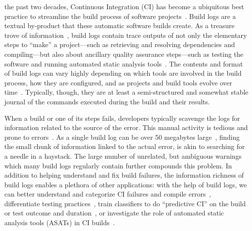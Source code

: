 
%


the past two decades, Continuous Integration (CI) has become a
ubiquitous best practice to streamline the build process of software
projects~\cite{hilton2016usage,beller2017oops,staahl2014modeling}.
Build logs are a textual by-product that these automatic software
builds create.
As a treasure trove of information~\cite{meyer},
build logs contain trace outputs of not only the elementary steps to
``make'' a project---such as retrieving and resolving dependencies and
compiling---but also about ancillary quality assurance steps---such as
testing the software and running automated static analysis
tools~\cite{beller2017oops}.
The
contents and format of build logs can vary highly depending on which tools
are involved in the build process, how they are
configured, and as projects and build tools evolve over
time~\cite{staahl2014modeling}.
Typically, though, they are at least a semi-structured and
somewhat stable journal of the commands executed during the build and
their results.

When a build or one of its steps fails, developers typically scavenge
the logs for information related to the source of the error.
This
manual activity is tedious and prone to
errors~\cite{santolucito2018statically}.
As a single build log can be
over 50 megabytes large~\cite{beller2017oops}, finding the small chunk
of information linked to the actual error, is akin to
searching for a needle in a haystack.
The large number of unrelated, but ambiguous
warnings which many build
logs regularly contain further compounds this problem.
In addition to helping
understand and fix build failures, the information richness of build
logs enables a plethora of other applications: with the help of build
logs, we can better understand and categorize CI failures and compile
errors~\cite{islam2017insights,seo2014programmers}, differentiate
testing practices~\cite{orellana2017differences,vassallo2017a-tale},
train classifiers to do ``predictive CI'' on the build or test outcome
and
duration~\cite{ni2017cost,bisong2017built,haghighatkhah2018test,
machalica2019predictive},
or investigate the role of automated static analysis tools (ASATs)
in CI
builds~\cite{zampetti2017open}.


